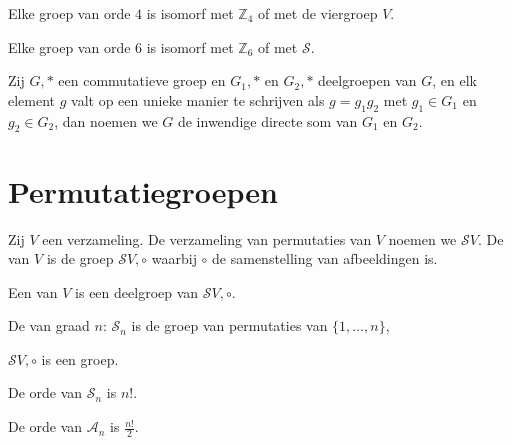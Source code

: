 \documentclass[main.tex]{subfiles}
\begin{document}
\begin{ei}
  \label{ei:groep-orde-vier}
  Elke groep van orde $4$ is isomorf met $\mathbb{Z}_{4}$ of met de viergroep $V$.

\end{ei}

\begin{ei}
  \label{ei-groep-orde-zes}
  Elke groep van orde $6$ is isomorf met $\mathbb{Z}_{6}$ of met $\mathcal{S}$. 

\end{ei}

\begin{de}
  Zij $G,*$ een commutatieve groep en $G_{1},*$ en $G_{2},*$ deelgroepen van $G$, en elk element $g$ valt op een unieke manier te schrijven als $g=g_{1}g_{2}$ met $g_{1}\in G_{1}$ en $g_{2}\in G_{2}$, dan noemen we $G$ de inwendige directe som van $G_{1}$ en $G_{2}$.
\end{de}

\section{Permutatiegroepen}
\label{sec:permutatiegroepen}

\begin{de}
  Zij $V$ een verzameling.
  De verzameling van permutaties van $V$ noemen we $\mathcal{S}V$.
  De  van $V$ is de groep $\mathcal{S}V, \circ$ waarbij $\circ$ de samenstelling van afbeeldingen is.
\end{de}

\begin{de}
  Een  van $V$ is een deelgroep van $\mathcal{S}V,\circ$.
\end{de}

\begin{de}
  De  van graad $n$: $\mathcal{S}_{n}$ is de groep van permutaties van $\{1,\dotsc,n\}$,
\end{de}

\begin{st}
  $\mathcal{S}V,\circ$ is een groep.

\end{st}

\begin{st}
  De orde van $\mathcal{S}_{n}$ is $n!$.

\end{st}

\begin{st}
  De orde van $\mathcal{A}_{n}$ is $\frac{n!}{2}$.

\end{st}
\end{document}
